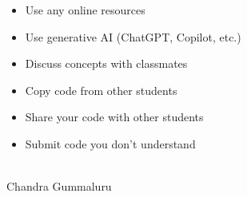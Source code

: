 \documentclass[mathserif, handout]{beamer}
\begin{document}
\begin{frame}
\begin{center}
\Large {}
\end{center}
\vspace{0.5cm}

\begin{itemize}
    \item Use any online resources
    \item Use generative AI (ChatGPT, Copilot, etc.)
    \item Discuss concepts with classmates
\end{itemize}

\vspace{0.5cm}

\begin{itemize}
    \item Copy code from other students
    \item Share your code with other students
    \item Submit code you don't understand
\end{itemize}
\end{frame}

\begin{frame}
\begin{center}
\Large {}
\end{center}
\vspace{0.5cm}
\begin{center}

\\
Chandra Gummaluru\\
\\
\\
\\

\vspace{0.5cm}

\\
\\
\end{center}

\end{frame}
\end{document}
